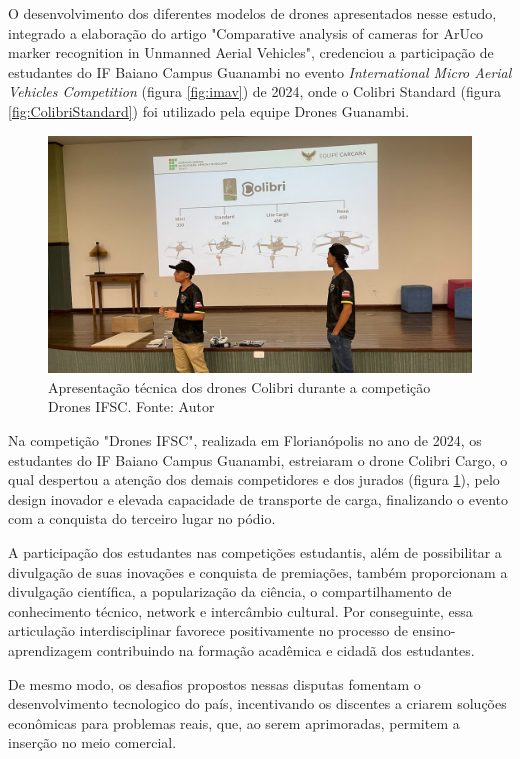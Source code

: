 \documentclass[conference]{IEEEtran}
\begin{document}
O desenvolvimento dos diferentes modelos de drones apresentados nesse estudo, integrado a elaboração do artigo "Comparative analysis of cameras for ArUco marker recognition in Unmanned Aerial Vehicles", credenciou a participação de estudantes do IF Baiano Campus Guanambi no evento \textit{International Micro Aerial Vehicles Competition} (figura \ref{fig:imav}) de 2024, onde o Colibri Standard (figura \ref{fig:ColibriStandard}) foi utilizado pela equipe Drones Guanambi.

\begin{figure}[!htb]
    \centering
    \includegraphics[scale=0.30]{img/ifsc.png} 
    \caption{Apresentação técnica dos drones Colibri durante a competição Drones IFSC. Fonte: Autor}
    \label{fig:ifsc}
\end{figure}

Na competição "Drones IFSC", realizada em Florianópolis no ano de 2024, os estudantes do IF Baiano Campus Guanambi, estreiaram o drone Colibri Cargo, o qual despertou a atenção dos demais competidores e dos jurados (figura \ref{fig:ifsc}), pelo design inovador e elevada capacidade de transporte de carga, finalizando o evento com a conquista do terceiro lugar no pódio.

A participação dos estudantes nas competições estudantis, além de possibilitar a divulgação de suas inovações e conquista de premiações, também proporcionam a divulgação científica, a popularização da ciência, o compartilhamento de conhecimento técnico, network e intercâmbio cultural. Por conseguinte, essa articulação interdisciplinar favorece positivamente no processo de ensino-aprendizagem contribuindo na formação acadêmica e cidadã dos estudantes.

De mesmo modo, os desafios propostos nessas disputas fomentam o desenvolvimento tecnologico do país, incentivando os discentes a criarem soluções econômicas para problemas reais, que, ao serem aprimoradas, permitem a inserção no meio comercial.
\end{document}
